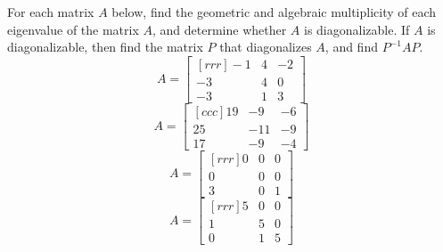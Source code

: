 \ii  For each matrix $A$ below, find the geometric and algebraic multiplicity of each eigenvalue of the matrix $A$, and determine whether $A$ is diagonalizable. If $A$ is diagonalizable, then find the matrix $P$ that diagonalizes $A$, and find $P^{-1}AP$.
\bb[itemsep=5pt, topsep=5pt]
\ii 
\[
A =
\begin{bmatrix}[rrr]
-1&4&-2\\
-3&4&0\\
-3&1&3
\end{bmatrix}
\]
\ii 
\[
A=
\begin{bmatrix}[ccc]
19&-9&-6\\
25&-11&-9\\
17&-9&-4
\end{bmatrix}
\]
\ii 
\[
A=
\begin{bmatrix}[rrr]
0&0&0\\
0&0&0\\
3&0&1
\end{bmatrix}
\]
\ii
\[
A =
\begin{bmatrix}[rrr]
5&0&0\\
1&5&0\\
0&1&5
\end{bmatrix}
\]
\ee
